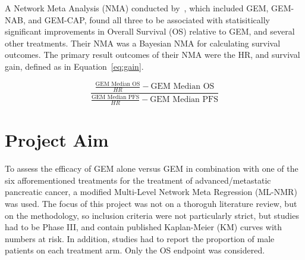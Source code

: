 A Network Meta Analysis (NMA) conducted by~\cite{gresham2014}, which included GEM, GEM-NAB, and GEM-CAP, found all three to be associated with statisitically significant improvements in Overall Survival (OS) relative to GEM, and several other treatments. Their NMA was a Bayesian NMA for calculating survival outcomes. The primary result outcomes of their NMA were the HR, and survival gain, defined as in Equation~\ref{eq:gain}. 

\begin{equation}
    \frac{\frac{\text{GEM Median OS}}{HR}-\text{GEM Median OS}}{\frac{\text{GEM Median PFS}}{HR}-\text{GEM Median PFS}}
    \label{eq:gain}
\end{equation}

\section{Project Aim}
To assess the efficacy of GEM alone versus GEM in combination with one of the six afforementioned treatments for the treatment of advanced/metastatic pancreatic cancer, a modified Multi-Level Network Meta Regression (ML-NMR) was used. The focus of this project was not on a thoroguh literature review, but on the methodology, so inclusion criteria were not particularly strict, but studies had to be Phase III, and contain published Kaplan-Meier (KM) curves with numbers at risk. In addition, studies had to report the proportion of male patients on each treatment arm. Only the OS endpoint was considered. 

